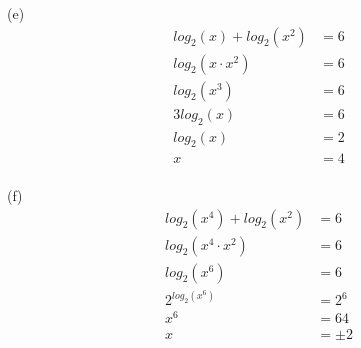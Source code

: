 \begin{exercise}
	(e) \\
	\begin{align}
		log_2(x) + log_2(x^2) & = 6 \\
		log_2(x \cdot x^2)    & = 6 \\
		log_2(x^3)            & = 6 \\
		3log_2(x)             & = 6 \\
		log_2(x)              & = 2 \\
		x                     & = 4
	\end{align}
	\\

	(f) \\
	\begin{align}
		log_2(x^4) + log_2(x^2) & = 6     \\
		log_2(x^4 \cdot x^2)    & = 6     \\
		log_2(x^6)              & = 6     \\
		2^{log_2(x^6)}          & = 2^6   \\
		x^6                     & = 64    \\
		x                       & = \pm 2
	\end{align}
\end{exercise}

\newpage